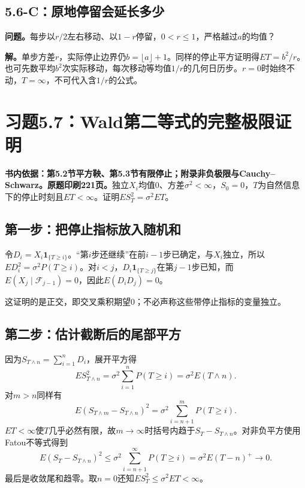 \documentclass[11pt,a4paper,UTF8,fontset=fandol]{ctexart}
\begin{document}
\subsection{5.6-C：原地停留会延长多少}\label{cux539fux5730ux505cux7559ux4f1aux5ef6ux957fux591aux5c11}

\textbf{问题。}每步以\(r/2\)左右移动、以\(1-r\)停留，\(0<r\le1\)，严格越过\(a\)的均值？

\textbf{解。}单步方差\(r\)，实际停止边界仍\(b=\lfloor a\rfloor+1\)。同样的停止平方证明得\(\boxed{ET=b^2/r}\)。也可先数平均\(b^2\)次实际移动，每次移动等均值\(1/r\)的几何日历步。\(r=0\)时始终不动，\(T=\infty\)，不可代入含\(1/r\)的公式。

\bigskip

\section{习题5.7：Wald第二等式的完整极限证明}\label{ux4e60ux98985.7waldux7b2cux4e8cux7b49ux5f0fux7684ux5b8cux6574ux6781ux9650ux8bc1ux660e}

\textbf{书内依据：第5.2节平方鞅、第5.3节有限停止；附录非负极限与Cauchy--Schwarz。原题印刷221页。}独立\(X_i\)均值0、方差\(\sigma^2<\infty\)，\(S_0=0\)，\(T\)为自然信息下的停止时刻且\(ET<\infty\)。证明\(ES_T^2=\sigma^2ET\)。

\subsection{第一步：把停止指标放入随机和}\label{ux7b2cux4e00ux6b65ux628aux505cux6b62ux6307ux6807ux653eux5165ux968fux673aux548c}

令\(D_i=X_i\mathbf1_{\{T\ge i\}}\)。``第\(i\)步还继续''在前\(i-1\)步已确定，与\(X_i\)独立，所以\(ED_i^2=\sigma^2P(T\ge i)\)。对\(i<j\)，\(D_i\mathbf1_{\{T\ge j\}}\)在第\(j-1\)步已知，而\(E(X_j\mid\mathcal F_{j-1})=0\)，因此\(E(D_iD_j)=0\)。

这证明的是正交，即交叉乘积期望0；不必声称这些带停止指标的变量独立。

\subsection{第二步：估计截断后的尾部平方}\label{ux7b2cux4e8cux6b65ux4f30ux8ba1ux622aux65adux540eux7684ux5c3eux90e8ux5e73ux65b9}

因为\(S_{T\wedge n}=\sum_{i=1}^nD_i\)，展开平方得
\[ES_{T\wedge n}^2=\sigma^2\sum_{i=1}^nP(T\ge i)=\sigma^2E(T\wedge n).\]
对\(m>n\)同样有
\[E(S_{T\wedge m}-S_{T\wedge n})^2=\sigma^2\sum_{i=n+1}^mP(T\ge i).\]
\(ET<\infty\)使\(T\)几乎必然有限，故\(m\to\infty\)时括号内趋于\(S_T-S_{T\wedge n}\)。对非负平方使用Fatou不等式得到
\[E(S_T-S_{T\wedge n})^2
\le\sigma^2\sum_{i=n+1}^{\infty}P(T\ge i)
=\sigma^2E(T-n)^+\longrightarrow0.\]
最后是收敛尾和趋零。取\(n=0\)还知\(ES_T^2\le\sigma^2ET<\infty\)。
\end{document}
